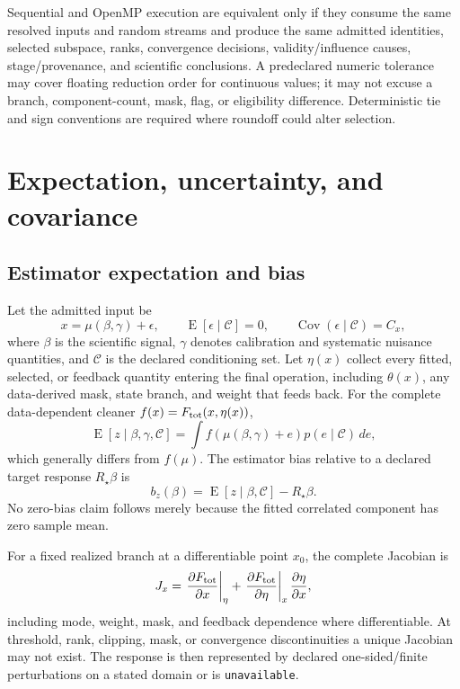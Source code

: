\documentclass[11pt]{article}
\newcommand{\unknown}{\texttt{unavailable}}
\newcommand{\E}{\operatorname{E}}
\newcommand{\Cov}{\operatorname{Cov}}
\begin{document}
Sequential and OpenMP execution are equivalent only if they consume the same
resolved inputs and random streams and produce the same admitted identities,
selected subspace, ranks, convergence decisions, validity/influence causes,
stage/provenance, and scientific conclusions.  A predeclared numeric tolerance
may cover floating reduction order for continuous values; it may not excuse a
branch, component-count, mask, flag, or eligibility difference.  Deterministic
tie and sign conventions are required where roundoff could alter selection.

\section{Expectation, uncertainty, and covariance}
\label{sec:uncertainty}

\subsection{Estimator expectation and bias}

Let the admitted input be
\begin{equation}
 x=\mu(\beta,\gamma)+\epsilon,
 \qquad \E[\epsilon\mid\mathcal C]=0,
 \qquad \Cov(\epsilon\mid\mathcal C)=C_x,
 \label{eq:data-model}
\end{equation}
where $\beta$ is the scientific signal, $\gamma$ denotes calibration and
systematic nuisance quantities, and $\mathcal C$ is the declared conditioning
set.  Let $\eta(x)$ collect every fitted, selected, or feedback quantity
entering the final operation, including $\theta(x)$, any data-derived mask,
state branch, and weight that feeds back.  For the complete data-dependent
cleaner $f(x)=F_{\rm tot}(x,\eta(x))$,
\begin{equation}
 \E[z\mid\beta,\gamma,\mathcal C]
 =\int f\!\left(\mu(\beta,\gamma)+e\right)
        p(e\mid\mathcal C)\,de,
 \label{eq:exact-expectation}
\end{equation}
which generally differs from $f(\mu)$.  The estimator bias relative to a
declared target response $R_\star\beta$ is
\begin{equation}
 b_z(\beta)=\E[z\mid\beta,\mathcal C]-R_\star\beta.
 \label{eq:estimator-bias}
\end{equation}
No zero-bias claim follows merely because the fitted correlated component has
zero sample mean.

For a fixed realized branch at a differentiable point $x_0$, the complete
Jacobian is
\begin{equation}
 J_x=\left.\frac{\partial F_{\rm tot}}{\partial x}\right|_{\eta}
     +\left.\frac{\partial F_{\rm tot}}{\partial\eta}\right|_{x}
       \frac{\partial\eta}{\partial x},
 \label{eq:complete-jacobian}
\end{equation}
including mode, weight, mask, and feedback dependence where differentiable.
At threshold, rank, clipping, mask, or convergence discontinuities a unique
Jacobian may not exist.  The response is then represented by declared
one-sided/finite perturbations on a stated domain or is \unknown.
\end{document}
